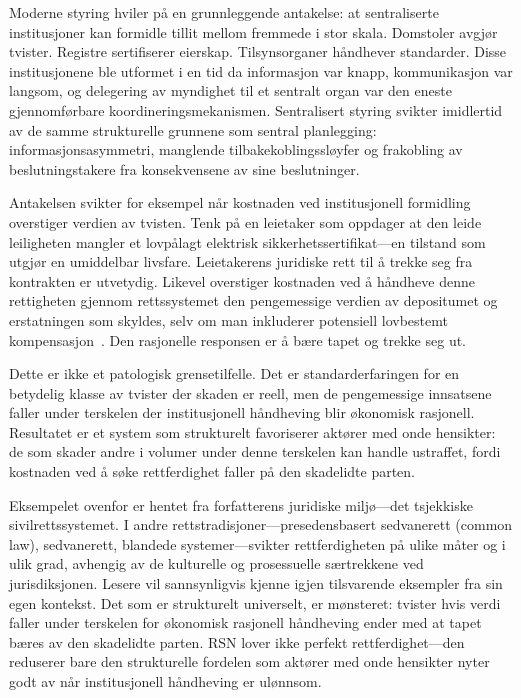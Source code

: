 \documentclass[11pt,a4paper,twocolumn]{article}
\begin{document}
Moderne styring hviler på en grunnleggende antakelse: at sentraliserte institusjoner kan formidle tillit mellom fremmede i stor skala. Domstoler avgjør tvister. Registre sertifiserer eierskap. Tilsynsorganer håndhever standarder. Disse institusjonene ble utformet i en tid da informasjon var knapp, kommunikasjon var langsom, og delegering av myndighet til et sentralt organ var den eneste gjennomførbare koordineringsmekanismen. Sentralisert styring svikter imidlertid av de samme strukturelle grunnene som sentral planlegging: informasjonsasymmetri, manglende tilbakekoblingssløyfer og frakobling av beslutningstakere fra konsekvensene av sine beslutninger.

Antakelsen svikter for eksempel når kostnaden ved institusjonell formidling overstiger verdien av tvisten. Tenk på en leietaker som oppdager at den leide leiligheten mangler et lovpålagt elektrisk sikkerhetssertifikat---en tilstand som utgjør en umiddelbar livsfare. Leietakerens juridiske rett til å trekke seg fra kontrakten er utvetydig. Likevel overstiger kostnaden ved å håndheve denne rettigheten gjennom rettssystemet den pengemessige verdien av depositumet og erstatningen som skyldes, selv om man inkluderer potensiell lovbestemt kompensasjon~\cite{czcourtfees}. Den rasjonelle responsen er å bære tapet og trekke seg ut.

Dette er ikke et patologisk grensetilfelle. Det er standarderfaringen for en betydelig klasse av tvister der skaden er reell, men de pengemessige innsatsene faller under terskelen der institusjonell håndheving blir økonomisk rasjonell. Resultatet er et system som strukturelt favoriserer aktører med onde hensikter: de som skader andre i volumer under denne terskelen kan handle ustraffet, fordi kostnaden ved å søke rettferdighet faller på den skadelidte parten.

Eksempelet ovenfor er hentet fra forfatterens juridiske miljø---det tsjekkiske sivilrettssystemet. I andre rettstradisjoner---presedensbasert sedvanerett (common law), sedvanerett, blandede systemer---svikter rettferdigheten på ulike måter og i ulik grad, avhengig av de kulturelle og prosessuelle særtrekkene ved jurisdiksjonen. Lesere vil sannsynligvis kjenne igjen tilsvarende eksempler fra sin egen kontekst. Det som er strukturelt universelt, er mønsteret: tvister hvis verdi faller under terskelen for økonomisk rasjonell håndheving ender med at tapet bæres av den skadelidte parten. RSN lover ikke perfekt rettferdighet---den reduserer bare den strukturelle fordelen som aktører med onde hensikter nyter godt av når institusjonell håndheving er ulønnsom.
\end{document}
